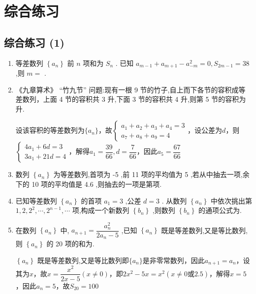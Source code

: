 \section*{综合练习}
\subsection*{综合练习 (1)}
\begin{enumerate}
    \item 等差数列 $\left\{  {a}_{n}\right\}$ 前 $n$ 项和为 ${S}_{n}$ . 已知 ${a}_{m - 1} + {a}_{m + 1} - {a}_{-m}^{2} = 0,{S}_{{2m} - 1} = {38}$ ,则 $m =$ .
    \item 《九章算术》 “竹九节” 问题:现有一根 9 节的竹子,自上而下各节的容积成等差数列，上面 4 节的容积共 3 升,下面 3 节的容积共 4 升,则第 5 节的容积为升.
    \begin{jieda}
    
        设该容积的等差数列为$\{a_n\}$，故$\left\{\begin{array}{l}
             a_1+a_2+a_3+a_4 = 3  \\
             a_7+a_8+a_9 = 4
        \end{array}\right.$，设公差为$d$，则$\left\{\begin{array}{l}
             4a_1 + 6d = 3  \\
             3a_1 + 21d = 4
        \end{array}\right.$，解得$a_1 = \dfrac{39}{66}, d = \dfrac{7}{66}$，因此$a_5 = \dfrac{67}{66}$
    \end{jieda}

    \item 数列 $\left\{  {a}_{n}\right\}$ 为等差数列,首项为 -5 ,前 11 项的平均值为 5 ,若从中抽去一项,余下的 10 项的平均值是 4.6 ,则抽去的一项是第项.
    
    \item 已知等差数列 $\left\{  {a}_{n}\right\}$ 的首项 ${a}_{1} = 3$ ,公差 $d = 3$ . 从数列 $\left\{  {a}_{n}\right\}$ 中依次挑出第 $1,2,{2}^{2},\cdots ,{2}^{n - 1},\cdots$ 项,构成一个新数列 $\left\{  {b}_{n}\right\}$ ,则数列 $\left\{  {b}_{n}\right\}$ 的通项公式为.

    \item 在数列 $\left\{  {a}_{n}\right\}$ 中, ${a}_{n + 1} = \dfrac{{a}_{n}^{2}}{2{a}_{n} - 5}$ ,已知 $\left\{  {a}_{n}\right\}$ 既是等差数列,又是等比数列,则 $\left\{  {a}_{n}\right\}$ 的 20 项的和为.
    \begin{jieda}
        $\left\{  {a}_{n}\right\}$ 既是等差数列,又是等比数列即$\{a_n\}$是非零常数列，因此$a_{n+1} = a_n$，设其为$x$，故$x = \dfrac{x^2}{2x-5} (x \neq 0)$，即$2x^2 - 5x = x^2 (x \neq 0 \text{或} 2.5)$，解得$x = 5$，因此$a_n = 5$，故$S_{20} = 100$
    \end{jieda}


\end{enumerate}
